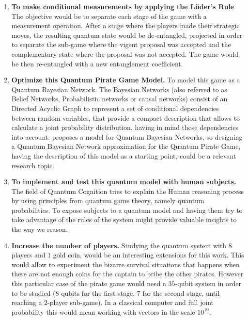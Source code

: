 \begin{enumerate}

\item \textbf{To make conditional measurements by applying the L\"{u}der's Rule} The objective would be to separate each stage of the game with a measurement operation. After a stage where the players made their strategic moves, the resulting quantum state would be de-entangled, projected in order to separate  the sub-game where the vigent proposal was accepted and the complementary state where the proposal was not accepted. The game would be then re-entangled with a new entanglement coefficient. 

\item \textbf{Optimize this Quantum Pirate Game Model.} To model this game as a Quantum Bayesian Network. The Bayesian Networks (also referred to as Belief Networks, Probabilistic networks or causal networks) consist of an Directed Acyclic Graph to represent a set of conditional dependencies between random variables, that provide a compact description that allows to calculate a joint probability distribution, having in mind those dependencies into account. \cite{Tucci2012} proposes a model for Quantum Bayesian Networks, so designing a Quantum Bayesian Network approximation for the Quantum Pirate Game, having the description of this model as a starting point, could be a relevant research topic.

\item \textbf{To implement and test this quantum model with human subjects.} The field of Quantum Cognition tries to explain the Human reasoning process by using principles from quantum game theory, namely quantum probabilities. To expose subjects to a quantum model and having them try to take advantage of the rules of the system might provide valuable insights to the way we reason. 

\item \textbf{Increase the number of players.} Studying the quantum system with $8$ players and $1$ gold coin, would be an interesting extensions for this work. This would allow to experiment the bizarre survival situations that happens when there are not enough coins for the captain to bribe the other pirates. However this particular case of the pirate game would need a $35$-qubit system in order to be studied ($8$ qubits for the first stage, $7$ for the second stage, until reaching a $2$-player sub-game). In a classical computer and full joint probability this would mean working with vectors in the scale $10^{10}$.


\end{enumerate}
